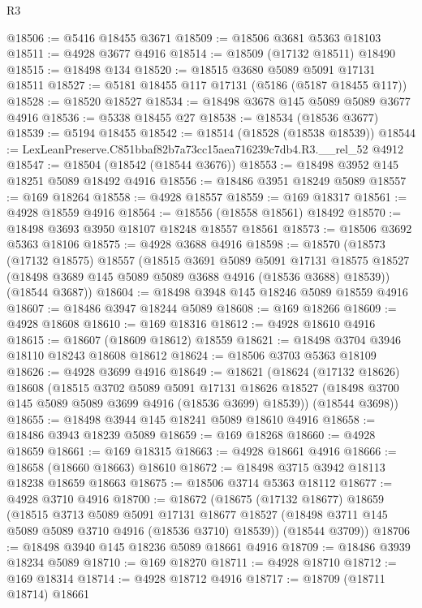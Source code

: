 \begin{lexlean}{R3}
\begin{coremodule}
@18506 := @5416 @18455 @3671
@18509 := @18506 @3681 @5363 @18103
@18511 := @4928 @3677 @4916
@18514 := @18509 (@17132 @18511) @18490
@18515 := @18498 @134
@18520 := @18515 @3680 @5089 @5091 @17131 @18511
@18527 := @5181 @18455 @117 @17131 (@5186 (@5187 @18455 @117))
@18528 := @18520 @18527
@18534 := @18498 @3678 @145 @5089 @5089 @3677 @4916
@18536 := @5338 @18455 @27
@18538 := @18534 (@18536 @3677)
@18539 := @5194 @18455
@18542 := @18514 (@18528 (@18538 @18539))
@18544 := LexLeanPreserve.C851bbaf82b7a73cc15aea716239c7db4.R3.__rel_52 @4912
@18547 := @18504 (@18542 (@18544 @3676))
@18553 := @18498 @3952 @145 @18251 @5089 @18492 @4916
@18556 := @18486 @3951 @18249 @5089
@18557 := @169 @18264
@18558 := @4928 @18557
@18559 := @169 @18317
@18561 := @4928 @18559 @4916
@18564 := @18556 (@18558 @18561) @18492
@18570 := @18498 @3693 @3950 @18107 @18248 @18557 @18561
@18573 := @18506 @3692 @5363 @18106
@18575 := @4928 @3688 @4916
@18598 := @18570
    (@18573
      (@17132 @18575)
      @18557
      (@18515
        @3691
        @5089
        @5091
        @17131
        @18575
        @18527
        (@18498 @3689 @145 @5089 @5089 @3688 @4916 (@18536 @3688) @18539))
      (@18544 @3687))
@18604 := @18498 @3948 @145 @18246 @5089 @18559 @4916
@18607 := @18486 @3947 @18244 @5089
@18608 := @169 @18266
@18609 := @4928 @18608
@18610 := @169 @18316
@18612 := @4928 @18610 @4916
@18615 := @18607 (@18609 @18612) @18559
@18621 := @18498 @3704 @3946 @18110 @18243 @18608 @18612
@18624 := @18506 @3703 @5363 @18109
@18626 := @4928 @3699 @4916
@18649 := @18621
    (@18624
      (@17132 @18626)
      @18608
      (@18515
        @3702
        @5089
        @5091
        @17131
        @18626
        @18527
        (@18498 @3700 @145 @5089 @5089 @3699 @4916 (@18536 @3699) @18539))
      (@18544 @3698))
@18655 := @18498 @3944 @145 @18241 @5089 @18610 @4916
@18658 := @18486 @3943 @18239 @5089
@18659 := @169 @18268
@18660 := @4928 @18659
@18661 := @169 @18315
@18663 := @4928 @18661 @4916
@18666 := @18658 (@18660 @18663) @18610
@18672 := @18498 @3715 @3942 @18113 @18238 @18659 @18663
@18675 := @18506 @3714 @5363 @18112
@18677 := @4928 @3710 @4916
@18700 := @18672
    (@18675
      (@17132 @18677)
      @18659
      (@18515
        @3713
        @5089
        @5091
        @17131
        @18677
        @18527
        (@18498 @3711 @145 @5089 @5089 @3710 @4916 (@18536 @3710) @18539))
      (@18544 @3709))
@18706 := @18498 @3940 @145 @18236 @5089 @18661 @4916
@18709 := @18486 @3939 @18234 @5089
@18710 := @169 @18270
@18711 := @4928 @18710
@18712 := @169 @18314
@18714 := @4928 @18712 @4916
@18717 := @18709 (@18711 @18714) @18661

\end{coremodule}
\end{lexlean}
